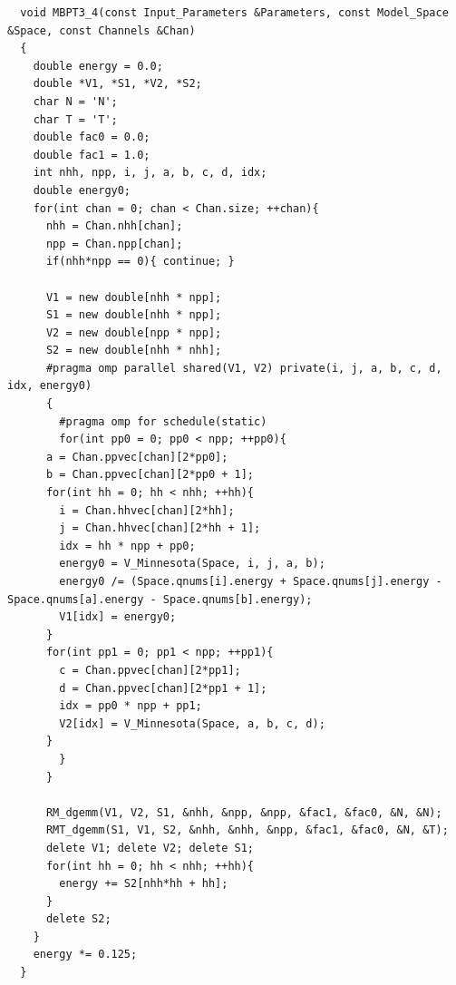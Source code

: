 \begin{lstlisting}
  void MBPT3_4(const Input_Parameters &Parameters, const Model_Space &Space, const Channels &Chan)
  {
    double energy = 0.0;
    double *V1, *S1, *V2, *S2;
    char N = 'N';
    char T = 'T';
    double fac0 = 0.0;
    double fac1 = 1.0;
    int nhh, npp, i, j, a, b, c, d, idx;
    double energy0;
    for(int chan = 0; chan < Chan.size; ++chan){
      nhh = Chan.nhh[chan];
      npp = Chan.npp[chan];
      if(nhh*npp == 0){ continue; }
      
      V1 = new double[nhh * npp];
      S1 = new double[nhh * npp];
      V2 = new double[npp * npp];
      S2 = new double[nhh * nhh];
      #pragma omp parallel shared(V1, V2) private(i, j, a, b, c, d, idx, energy0)
      {
        #pragma omp for schedule(static)
        for(int pp0 = 0; pp0 < npp; ++pp0){
	  a = Chan.ppvec[chan][2*pp0];
	  b = Chan.ppvec[chan][2*pp0 + 1];
	  for(int hh = 0; hh < nhh; ++hh){
	    i = Chan.hhvec[chan][2*hh];
	    j = Chan.hhvec[chan][2*hh + 1];
	    idx = hh * npp + pp0;
	    energy0 = V_Minnesota(Space, i, j, a, b);
	    energy0 /= (Space.qnums[i].energy + Space.qnums[j].energy - Space.qnums[a].energy - Space.qnums[b].energy);
	    V1[idx] = energy0;
	  }
	  for(int pp1 = 0; pp1 < npp; ++pp1){
	    c = Chan.ppvec[chan][2*pp1];
	    d = Chan.ppvec[chan][2*pp1 + 1];
	    idx = pp0 * npp + pp1;
	    V2[idx] = V_Minnesota(Space, a, b, c, d);
	  }
        }
      }
      
      RM_dgemm(V1, V2, S1, &nhh, &npp, &npp, &fac1, &fac0, &N, &N);
      RMT_dgemm(S1, V1, S2, &nhh, &nhh, &npp, &fac1, &fac0, &N, &T);
      delete V1; delete V2; delete S1;
      for(int hh = 0; hh < nhh; ++hh){
        energy += S2[nhh*hh + hh];
      }
      delete S2;
    }
    energy *= 0.125;
  }
\end{lstlisting}

